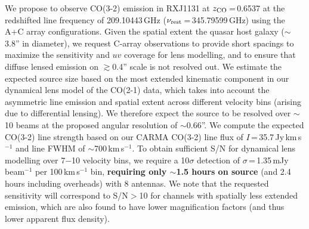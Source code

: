 \documentclass[11pt,a4paper,twoside,graphicx,color]{article}
\newcommand{\bco}{\mbox{CO(2-1)}\xspace}
\newcommand{\cco}{\mbox{CO(3-2)}\xspace}
\newcommand{\kms}{km\,s$^{-1}$\xspace}
\newcommand{\pmOne}{\mbox{$^{-1}$}\xspace}
\newcommand{\eq}{\,=\,}
\newcommand{\obs}{observations\xspace}
\begin{document}
\vspace{.2em}
We propose to observe \cco emission in RXJ1131 at $z_{\rm CO}$\eq0.6537 at the 
redshifted line frequency of 209.10443\,GHz ($\nu_{\rm rest}$\eq345.79599\,GHz) using the A+C array configurations. 
Given the spatial extent the quasar host galaxy ($\sim$3.8'' in diameter), 
we request C-array \obs to provide short spacings 
to maximize the sensitivity and $uv$ coverage for lens modelling, and to
ensure that diffuse lensed emission on $\gtrsim$0.4'' scale is not resolved out. %
We estimate the expected source size based on the
most extended kinematic component in our dynamical lens model of the \bco data, which takes into account the asymmetric line emission and spatial extent across different velocity bins (arising due to differential lensing).
We therefore expect the source to be resolved over $\sim$10 beams at the proposed angular resolution of $\sim$0.66''.
We compute the expected \cco line strength based on our 
CARMA \cco line flux of $I$\eq35.7\,Jy\,\kms and line FWHM of $\sim$700\,\kms.
To obtain sufficient S/N for dynamical lens modelling over 7$-$10 velocity bins, 
we require a 10$\sigma$ detection of $\sigma$\eq1.35\,mJy\,beam\pmOne per 100\,\kms bin,
{\bf requiring only $\sim$1.5 hours on source} (and 2.4 hours including overheads) with 8 antennas.
We note that the requested sensitivity will correspond to S/N$>$10 for channels with spatially less extended emission, which are also found to have lower magnification factors (and thus lower apparent flux density). 

\clearpage
\end{document}
